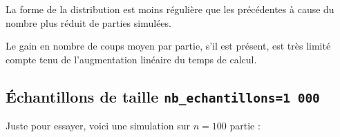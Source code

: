 \begin{center}
\end{center}

La forme de la distribution est moins régulière que les précédentes à cause du nombre plus réduit de parties simulées.

Le gain en nombre de coups moyen par partie, s'il est présent, est très limité compte tenu de l'augmentation linéaire du temps de calcul. 

\newpage
\subsection{Échantillons de taille \texttt{nb\_echantillons=1\,000}}
Juste pour essayer, voici une simulation sur $n=100$ partie :

\begin{center}
\end{center}


